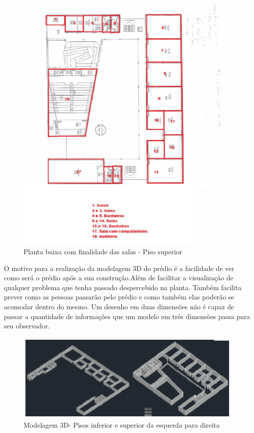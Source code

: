 \begin{figure}[!h]
  \centering
  \includegraphics[keepaspectratio=true,scale=1]{figuras/plantabaixa2.eps}
  \caption{Planta baixa com finalidade das salas - Piso superior}
  \label{fig:planta_salas_superior}
\end{figure}

O motivo para a realização da modelagem 3D do prédio é a facilidade de ver como será o prédio após a sua construção.Além de facilitar a visualização de qualquer problema que tenha passado despercebido na planta. Também facilita prever como as pessoas passarão pelo prédio e como também elas poderão se acomodar dentro do mesmo. Um desenho em duas dimensões não é capaz de passar a quantidade de informações que um modelo em três dimensões passa para seu observador.

\begin{figure}[!h]
  \centering
  \includegraphics[keepaspectratio=true,scale=1]{figuras/modelagemautocad.eps}
  \caption{Modelagem 3D- Pisos inferior e superior da esquerda para direita}
  \label{fig:modelagem_3d}
\end{figure}

